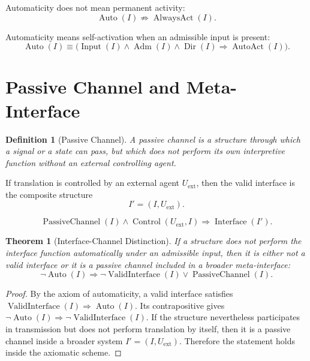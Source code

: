 \documentclass[12pt,a4paper]{article}
\newtheorem{definition}{Definition}
\newtheorem{theorem}{Theorem}
\DeclareMathOperator{\Valid}{ValidInterface}
\DeclareMathOperator{\Interface}{Interface}
\DeclareMathOperator{\Auto}{Auto}
\DeclareMathOperator{\AlwaysAct}{AlwaysAct}
\DeclareMathOperator{\Input}{Input}
\DeclareMathOperator{\Adm}{Adm}
\DeclareMathOperator{\Dir}{Dir}
\DeclareMathOperator{\AutoAct}{AutoAct}
\DeclareMathOperator{\PassiveChannel}{PassiveChannel}
\DeclareMathOperator{\Control}{Control}
\begin{document}
Automaticity does not mean permanent activity:
\begin{equation}
\boxed{\Auto(I)\not\Rightarrow\AlwaysAct(I).}
\end{equation}

Automaticity means self-activation when an admissible input is present:
\begin{equation}
\boxed{\Auto(I)\equiv\bigl(\Input(I)\land\Adm(I)\land\Dir(I)\Rightarrow\AutoAct(I)\bigr).}
\end{equation}

\section{Passive Channel and Meta-Interface}
\begin{definition}[Passive Channel]
A passive channel is a structure through which a signal or a state can pass, but which does not perform its own interpretive function without an external controlling agent.
\end{definition}

If translation is controlled by an external agent \(U_{\mathrm{ext}}\), then the valid interface is the composite structure
\begin{equation}
\boxed{I'=(I,U_{\mathrm{ext}}).}
\end{equation}

\begin{equation}
\boxed{\PassiveChannel(I)\land\Control(U_{\mathrm{ext}},I)\Rightarrow\Interface(I').}
\end{equation}

\begin{theorem}[Interface-Channel Distinction]
If a structure does not perform the interface function automatically under an admissible input, then it is either not a valid interface or it is a passive channel included in a broader meta-interface:
\begin{equation}
\boxed{\neg\Auto(I)\Rightarrow \neg\Valid(I)\lor\PassiveChannel(I).}
\end{equation}
\end{theorem}

\begin{proof}
By the axiom of automaticity, a valid interface satisfies \(\Valid(I)\Rightarrow\Auto(I)\). Its contrapositive gives \(\neg\Auto(I)\Rightarrow\neg\Valid(I)\). If the structure nevertheless participates in transmission but does not perform translation by itself, then it is a passive channel inside a broader system \(I'=(I,U_{\mathrm{ext}})\). Therefore the statement holds inside the axiomatic scheme.
\end{proof}
\end{document}
